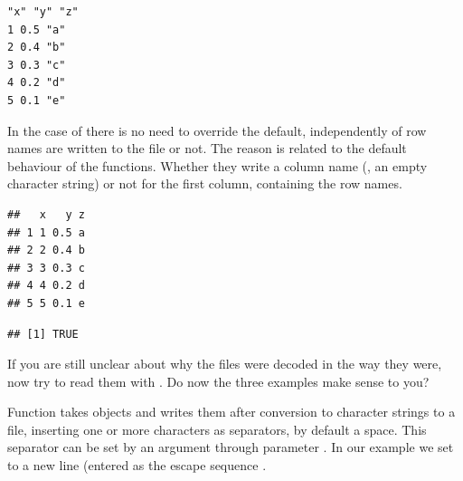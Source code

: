 \documentclass[krantz2]{krantz}\usepackage{knitr}%
\begin{document}
\begin{knitrout}\footnotesize
{}\color{fgcolor}\begin{kframe}
\begin{verbatim}
"x" "y" "z"
1 0.5 "a"
2 0.4 "b"
3 0.3 "c"
4 0.2 "d"
5 0.1 "e"
\end{verbatim}
\end{kframe}
\end{knitrout}

In the case of  there is no need to override the default, independently of row names are written to the file or not. The reason is related to the default behaviour of the  functions. Whether they write a column name (, an empty character string) or not for the first column, containing the row names.
\begin{knitrout}\footnotesize
{}\color{fgcolor}\begin{kframe}
\begin{alltt}
 \hlkwb{<-} \hlstd{(} \hlstd{=} \hlstd{,}  \hlstd{=} \hlstd{)}
\end{alltt}
\begin{verbatim}
##   x   y z
## 1 1 0.5 a
## 2 2 0.4 b
## 3 3 0.3 c
## 4 4 0.2 d
## 5 5 0.1 e
\end{verbatim}
\begin{alltt}
  \hlstd{=} \hlstd{)}
\end{alltt}
\begin{verbatim}
## [1] TRUE
\end{verbatim}
\end{kframe}
\end{knitrout}

\begin{playground}
If you are still unclear about why the files were decoded in the way they were, now try to read them with . Do now the three examples make sense to you?
\end{playground}

Function  takes \Rlang objects and writes them after conversion to character strings to a file, inserting one or more characters as separators, by default a space. This separator can be set by an argument through parameter . In our example we set  to a new line (entered as the escape sequence .
\end{document}
